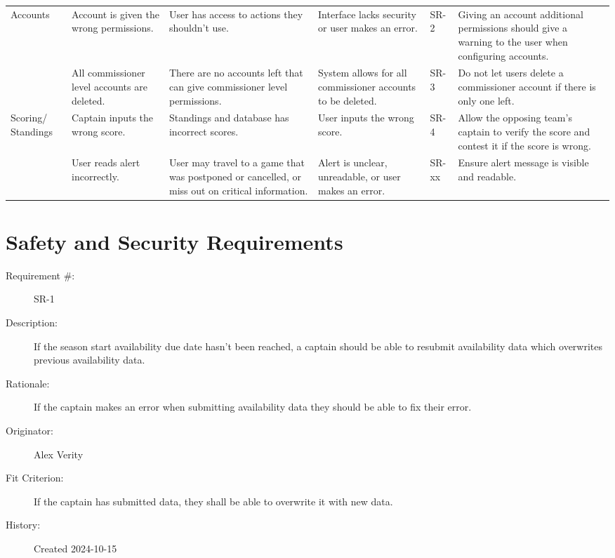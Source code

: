 \documentclass{article}
\newenvironment{myreq}[1]{%
\setlist[description]{font=\normalfont\color{darkgray}}%
\begin{tcolorbox}[colframe=black,colback=white, sharp corners, boxrule=1pt]%
\bfseries\color{blue}%
\begin{description}#1}%
{\end{description}\end{tcolorbox}}
\newcommand{\twoinline}[2]{\begin{multicols}{2}#1 #2\end{multicols}}
\newcommand{\reqno}{\item[Requirement \#:]}
\newcommand{\reqdesc}{\item[Description:]}
\newcommand{\reqrat}{\item[Rationale:]}
\newcommand{\reqorig}{\item[Originator:]}
\newcommand{\reqfit}{\item[Fit Criterion:]}
\newcommand{\reqsatis}{\item[Customer Satisfaction:]}
\newcommand{\reqdissat}{\item[Customer Dissatisfaction:]}
\newcommand{\reqhist}{\item[History:]}
\begin{document}
\begin{landscape}
\begin{tabularx}{504pt}{|p{3cm}||p{4cm}|p{4cm}|p{4cm}|p{1cm}|p{5.75cm}|}
\cline{1-6}
\multirow{2}{2cm}{Accounts} & Account is given the wrong permissions. & User 
has access to actions they shouldn't use. & Interface lacks security or user
makes an error. & SR-2 & Giving an account additional permissions should give
a warning to the user when configuring accounts.\\
\cline{2-6}
& All commissioner level accounts are deleted. & There are no accounts left
that can give commissioner level permissions. & System allows for all
commissioner accounts to be deleted. & SR-3 & Do not let users delete a
commissioner account if there is only one left.\\
\cline{1-6}
\multirow{3}{2cm}{Scoring/ Standings} & Captain inputs the wrong score. &
Standings and database has incorrect scores. & User inputs the wrong score. &
SR-4 & Allow the opposing team's captain to verify the score and contest it if
the score is wrong.\\
\cline{2-6}
\cline{1-6}
\multirow{3}{2cm}{Alerts} & User reads alert incorrectly. &
User may travel to a game that was postponed or cancelled, or miss out on
critical information. & Alert is unclear, unreadable, or user makes an error. &
SR-xx & Ensure alert message is visible and readable.\\
\cline{2-6}
\hline
\end{tabularx}

\end{landscape}

\section{Safety and Security Requirements}


\begin{myreq}
    \reqno SR-1
    \reqdesc If the season start availability due date hasn't been reached, a
    captain should be able to resubmit availability data which overwrites
    previous availability data.
    \reqrat If the captain makes an error when submitting availability data
    they should be able to fix their error.
    \reqorig Alex Verity
    \reqfit If the captain has submitted data, they shall be able to overwrite
    it with new data.
    \twoinline
      {\reqsatis 4}
      {\reqdissat 3}
    \reqhist Created 2024-10-15
\end{myreq}
\end{document}
